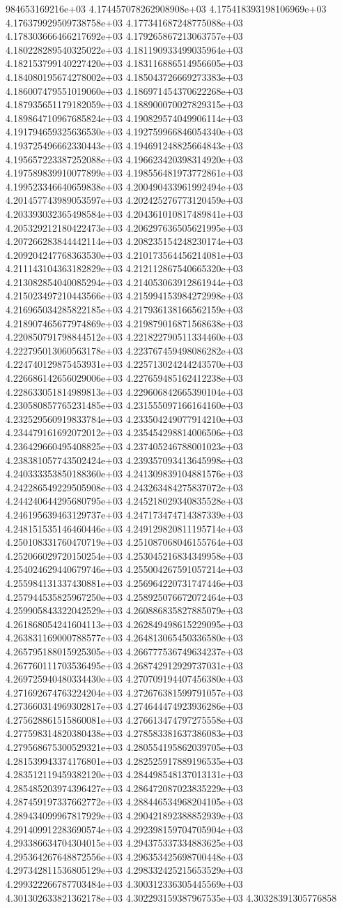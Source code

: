 984653169216e+03	4.174457078262908908e+03	4.175418393198106969e+03	4.176379929509738758e+03	4.177341687248775088e+03	4.178303666466217692e+03	4.179265867213063757e+03	4.180228289540325022e+03	4.181190933499035964e+03	4.182153799140227420e+03	4.183116886514956605e+03	4.184080195674278002e+03	4.185043726669273383e+03	4.186007479551019060e+03	4.186971454370622268e+03	4.187935651179182059e+03	4.188900070027829315e+03	4.189864710967685824e+03	4.190829574049906114e+03	4.191794659325636530e+03	4.192759966846054340e+03	4.193725496662330443e+03	4.194691248825664843e+03	4.195657223387252088e+03	4.196623420398314920e+03	4.197589839910077899e+03	4.198556481973772861e+03	4.199523346640659838e+03	4.200490433961992494e+03	4.201457743989053597e+03	4.202425276773120459e+03	4.203393032365498584e+03	4.204361010817489841e+03	4.205329212180422473e+03	4.206297636505621995e+03	4.207266283844442114e+03	4.208235154248230174e+03	4.209204247768363530e+03	4.210173564456214081e+03	4.211143104363182829e+03	4.212112867540665320e+03	4.213082854040085294e+03	4.214053063912861944e+03	4.215023497210443566e+03	4.215994153984272998e+03	4.216965034285822185e+03	4.217936138166562159e+03	4.218907465677974869e+03	4.219879016871568638e+03	4.220850791798844512e+03	4.221822790511334460e+03	4.222795013060563178e+03	4.223767459498086282e+03	4.224740129875453931e+03	4.225713024244243570e+03	4.226686142656029006e+03	4.227659485162412238e+03	4.228633051814989813e+03	4.229606842665390104e+03	4.230580857765231485e+03	4.231555097166164160e+03	4.232529560919833784e+03	4.233504249077914210e+03	4.234479161692072012e+03	4.235454298814006506e+03	4.236429660495408825e+03	4.237405246788001023e+03	4.238381057743502424e+03	4.239357093413645998e+03	4.240333353850188360e+03	4.241309839104881576e+03	4.242286549229505908e+03	4.243263484275837072e+03	4.244240644295680795e+03	4.245218029340835528e+03	4.246195639463129737e+03	4.247173474714387339e+03	4.248151535146460446e+03	4.249129820811195714e+03	4.250108331760470719e+03	4.251087068046155764e+03	4.252066029720150254e+03	4.253045216834349958e+03	4.254024629440679746e+03	4.255004267591057214e+03	4.255984131337430881e+03	4.256964220731747446e+03	4.257944535825967250e+03	4.258925076672072464e+03	4.259905843322042529e+03	4.260886835827885079e+03	4.261868054241604113e+03	4.262849498615229095e+03	4.263831169000788577e+03	4.264813065450336580e+03	4.265795188015925305e+03	4.266777536749634237e+03	4.267760111703536495e+03	4.268742912929737031e+03	4.269725940480334430e+03	4.270709194407456380e+03	4.271692674763224204e+03	4.272676381599791057e+03	4.273660314969302817e+03	4.274644474923936286e+03	4.275628861515860081e+03	4.276613474797275558e+03	4.277598314820380438e+03	4.278583381637386083e+03	4.279568675300529321e+03	4.280554195862039705e+03	4.281539943374176801e+03	4.282525917889196535e+03	4.283512119459382120e+03	4.284498548137013131e+03	4.285485203974396427e+03	4.286472087023835229e+03	4.287459197337662772e+03	4.288446534968204105e+03	4.289434099967817929e+03	4.290421892388852939e+03	4.291409912283690574e+03	4.292398159704705904e+03	4.293386634704304015e+03	4.294375337334883625e+03	4.295364267648872556e+03	4.296353425698700448e+03	4.297342811536805129e+03	4.298332425215653529e+03	4.299322266787703484e+03	4.300312336305445569e+03	4.301302633821362178e+03	4.302293159387967535e+03	4.30328391305776858